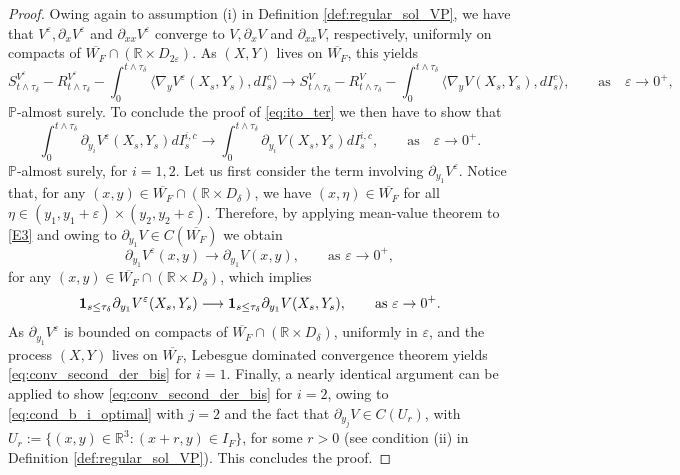 \documentclass[10pt]{article}
\numberwithin{equation}{section}
\theoremstyle{plain}
\numberwithin{theorem}{section}
\theoremstyle{definition}
\def \R {\mathbb{R}}
\def \p {\partial}
\newcommand{\<}{\langle}
\renewcommand{\>}{\rangle}
\renewcommand{\(}{\left(}
\renewcommand{\)}{\right)}
\newcommand\Pb{\mathbb{P}}
\newcommand\eps{\varepsilon}
\def \R  {{\mathbb {R}}}
\def \eps {{\varepsilon}}
\def \p {{\partial}}
\def \R {{\mathbb {R}}}
\def \eps {{\varepsilon}}
\begin{document}
{{{\begin{proof}
Owing again to assumption (i) in Definition \ref{def:regular_sol_VP}, we have that $V^{\eps}, \partial_x V^{\eps}$ and $\partial_{xx} V^{\eps}$ converge to $V, \partial_x V$ and $\partial_{xx} V$, respectively, uniformly on compacts of $\overline{W_F}\cap (\R\times D_{2\eps})$. As $(X,Y)$ lives on $\overline{W_F}$, this yields
\begin{equation}%
S^{V^{\eps}}_{t\wedge \tau_{\delta}} - R^{V^{\eps}}_{t\wedge \tau_{\delta}} - \int_0^{{t\wedge \tau_{\delta}}} \big\langle \nabla_y V^{\eps} (X_s , Y_s ) , d I^c_s \big\rangle \longrightarrow S^{V}_{t\wedge \tau_{\delta}} - R^{V}_{t\wedge \tau_{\delta}} -\int_0^{{t\wedge \tau_{\delta}}} \big\langle \nabla_y V (X_s , Y_s ) , d I^c_s \big\rangle, \qquad \text{as}\quad \eps\to 0^+,
\end{equation}
$\Pb$-almost surely. To conclude the proof of \eqref{eq:ito_ter} we then have to show that
\begin{equation}\label{eq:conv_second_der_bis}
 \int_0^{{t\wedge \tau_{\delta}}} \partial_{y_i} V^{\eps} (X_s , Y_s )  d I^{i,c}_s  \longrightarrow  \int_0^{{t\wedge \tau_{\delta}}} \partial_{y_i} V (X_s , Y_s )  d I^{i,c}_s  , \qquad \text{as}\quad \eps\to 0^+.
\end{equation}
$\Pb$-almost surely, for $i=1,2$. Let us first consider the term involving $\partial_{y_1}V^{\eps}$. Notice that, for any $(x,y)\in \overline{W_F} \cap (\R\times D_{\delta})$, we have $(x,\eta)\in \overline{W_F}$ for all $\eta\in (y_1,y_1+\eps) \times (y_2,y_2+\eps)$. Therefore, by applying mean-value theorem to \eqref{E3} and owing to $\partial_{y_1}V\in C(\overline{W_F})$ we obtain
\begin{equation}%
\partial_{y_1}V^{\eps}(x,y)\longrightarrow \partial_{y_1}V(x,y), \qquad \text{as } \eps\to 0^+,
\end{equation}
for any $(x,y)\in \overline{W_F} \cap (\R\times D_{\delta})$, which implies%
\begin{equation}%
{\bf 1}_{s\leq \tau_{\delta}} \partial_{y_1}V^{\eps}(X_s,Y_s) \longrightarrow  {\bf 1}_{s\leq \tau_{\delta}}  \partial_{y_1}V (X_s,Y_s) , \qquad \text{as } \eps\to 0^+.
\end{equation}
As $\partial_{y_1}V^{\eps}$ is bounded on compacts of $\overline{W_F} \cap (\R\times D_{\delta})$, uniformly in $\eps$, and the process $(X,Y)$ lives on $\overline{W_F}$, Lebesgue dominated convergence theorem yields \eqref{eq:conv_second_der_bis} for $i=1$.
Finally, a nearly identical argument can be applied to show \eqref{eq:conv_second_der_bis} for $i=2$, owing to \eqref{eq:cond_b_i_optimal} with $j=2$ and the fact that $\p_{y_j} V\in C(U_r)$, with $%
U_r := \{(x,y) \in \R^3 : (x+r,y)\in I_F\}$, for some $r>0$ (see condition (ii) in Definition \ref{def:regular_sol_VP}). This concludes the proof. 
\end{proof}

}}}
\end{document}
